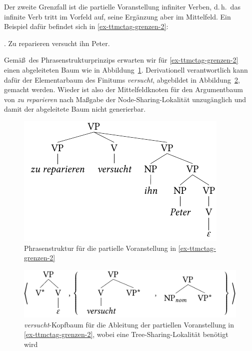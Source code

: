 Der zweite Grenzfall ist die partielle Voranstellung infiniter Verben, d.\,h.\ das infinite Verb tritt im Vorfeld auf, seine Ergänzung aber im Mittelfeld. Ein Beispiel dafür befindet sich in \ref{ex-ttmctag-grenzen-2}:   

\ex. Zu reparieren versucht ihn Peter. \label{ex-ttmctag-grenzen-2}

Gemä\ss\ des Phrasenstrukturprinzips erwarten wir für \ref{ex-ttmctag-grenzen-2} einen abgeleiteten Baum wie in Abbildung~\ref{fig-ttmctag-grenzen-3}. Derivationell verantwortlich kann dafür der Elementarbaum des Finitums {\it versucht}, abgebildet in Abbildung~\ref{fig-ttmctag-grenzen-4}, gemacht werden. Wieder ist also der Mittelfeldknoten für den Argumentbaum von {\it zu reparieren} nach Ma\ss gabe der Node-Sharing-Lokalität unzugänglich und damit der abgeleitete Baum nicht generierbar.
 
\begin{figure}[t]
\centering
\includegraphics{graphics/abb731.pdf}
\caption{\label{fig-ttmctag-grenzen-3}Phrasenstruktur für die partielle Voranstellung in \ref{ex-ttmctag-grenzen-2}}
\end{figure} 
\begin{figure}[t]
\centering
\includegraphics{graphics/abb732.pdf}
\caption{\label{fig-ttmctag-grenzen-4}{\it versucht}-Kopfbaum für die Ableitung der partiellen Voranstellung in \ref{ex-ttmctag-grenzen-2}, wobei eine Tree-Sharing-Lokalität benötigt wird}
\end{figure} 

